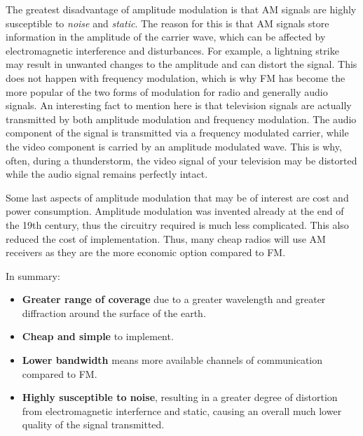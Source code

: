 The greatest disadvantage of amplitude modulation is that AM signals are highly susceptible to \emph{noise} and \emph{static}. The reason for this is that AM signals store information in the amplitude of the carrier wave, which can be affected by electromagnetic interference and disturbances. For example, a lightning strike may result in unwanted changes to the amplitude and can distort the signal. This does not happen with frequency modulation, which is why FM has become the more popular of the two forms of modulation for radio and generally audio signals. An interesting fact to mention here is that television signals are actually transmitted by both amplitude modulation and frequency modulation. The audio component of the signal is transmitted via a frequency modulated carrier, while the video component is carried by an amplitude modulated wave. This is why, often, during a thunderstorm, the video signal of your television may be distorted while the audio signal remains perfectly intact.

Some last aspects of amplitude modulation that may be of interest are cost and power consumption. Amplitude modulation was invented already at the end of the 19th century, thus the circuitry required is much less complicated. This also reduced the cost of implementation. Thus, many cheap radios will use AM receivers as they are the more economic option compared to FM.

In summary:

\begin{itemize}


	\begin{itemize}

		\item \textbf{Greater range of coverage} due to a greater wavelength and greater diffraction around the surface of the earth.

		\item \textbf{Cheap and simple} to implement.

		\item \textbf{Lower bandwidth} means more available channels of communication compared to FM.

	\end{itemize}


	\begin{itemize}

		\item \textbf{Highly susceptible to noise}, resulting in a greater degree of distortion from electromagnetic interfernce and static, causing an overall much lower quality of the signal transmitted.

	\end{itemize}

\end{itemize}

